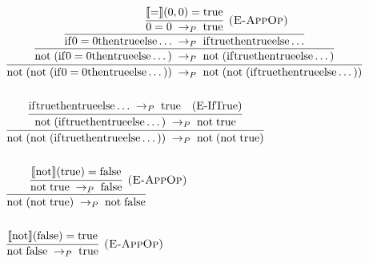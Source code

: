\begin{align*}
{{{      }
    }
  } \\\\
  & \infer {
    \Reduce{P}
        {\App{\mathrm{not}}{\paren{\App{\mathrm{not}}{\paren
          {\If{0 = 0}{\true}{\dots}}
        }}}}
        {\App{\mathrm{not}}{\paren{\App{\mathrm{not}}{\paren
          {\If{\true}{\true}{\dots}}
        }}}}
  } {
    \infer {
      \Reduce{P}
        {\App{\mathrm{not}}{\paren{\If{0 = 0}{\true}{\dots}}}}
        {\App{\mathrm{not}}{\paren{\If{\true}{\true}{\dots}}}}
    } {
      \infer {
        \Reduce{P}
          {\If{0 = 0}{\true}{\dots}}
          {\If{\true}{\true}{\dots}}
      } {
        \infer[\ERuleAppOp] {
          \Reduce{P}{0 = 0}{\true}
        } {
          \sem{=}\paren{0, 0} = \true
        }
      }
    }
  } \\\\
  & \infer {
    \Reduce{P}
      {\App{\mathrm{not}}{\paren{\App{\mathrm{not}}{\paren
          {\If{\true}{\true}{\dots}}
      }}}}
      {\App{\mathrm{not}}{\paren{\App{\mathrm{not}}{\true}}}}
  } {
    \infer {
      \Reduce{P}
        {\App{\mathrm{not}}{\paren{\If{\true}{\true}{\dots}}}}
        {\App{\mathrm{not}}{\true}}
    } {
      \Reduce{P}
        {\If{\true}{\true}{\dots}}
        {\true} \quad \ERuleIfTrue
    }
  } \\\\
  & \infer {
    \Reduce{P}
      {\App{\mathrm{not}}{\paren{\App{\mathrm{not}}{\true}}}}
      {\App{\mathrm{not}}{\false}}
  } {
    \infer[\ERuleAppOp] {
      \Reduce{P}
        {\App{\mathrm{not}}{\true}}
        {\false}
    } {
      \sem{\mathrm{not}}\paren{\true} = \false
    }
  } \\\\
  & \infer[\ERuleAppOp] {
    \Reduce{P}{\App{\mathrm{not}}{\false}}{\true}
  } {
    \sem{\mathrm{not}}\paren{\false} = \true
  }
\end{align*}
